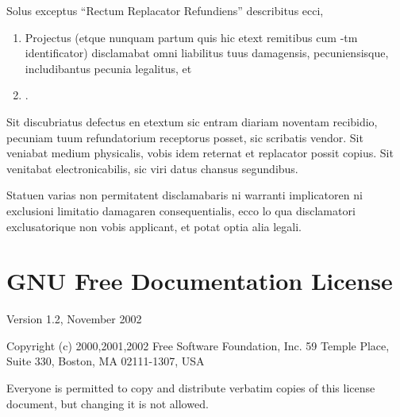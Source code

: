 
Solus exceptus ``Rectum Replacator Refundiens'' describitus ecci,
\begin{enumerate}
\item Projectus (etque nunquam partum quis hic etext remitibus cum -tm identificator) disclamabat omni liabilitus tuus damagensis,
pecuniensisque, includibantus pecunia legalitus, et 
\item {}. 
\end{enumerate}
Sit discubriatus defectus en etextum sic entram diariam noventam recibidio,
pecuniam tuum refundatorium receptorus posset, sic scribatis vendor.
Sit veniabat medium physicalis, vobis idem reternat et replacator
possit copius. Sit venitabat electronicabilis, sic viri datus chansus
segundibus. 


Statuen varias non permitatent disclamabaris ni warranti implicatoren
ni exclusioni limitatio damagaren consequentialis, ecco lo qua disclamatori
exclusato\-rique non vobis applicant, et potat optia alia legali.

\twocolumn

\chapter{GNU Free Documentation License\label{sec:GFDL} }

{\footnotesize{}Version 1.2, November 2002}{\footnotesize\par}

{\tiny{}Copyright (c) 2000,2001,2002 Free Software Foundation, Inc.
59 Temple Place, Suite 330, Boston, MA 02111-1307, USA}{\tiny\par}

{\tiny{}Everyone is permitted to copy and distribute verbatim copies
of this license document, but changing it is not allowed.}{\tiny\par}

{\tiny{}\setcounter{subsection}{-1}}{\tiny\par}

